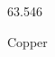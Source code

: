 \documentclass[12pt]{article}
\begin{document}
\hfill{}
\vfill
\begin{center}
  {\fontsize{50}{60}
  }

  \vspace{1em}

  63.546

Copper
\end{center}
\vfill
\end{document}
